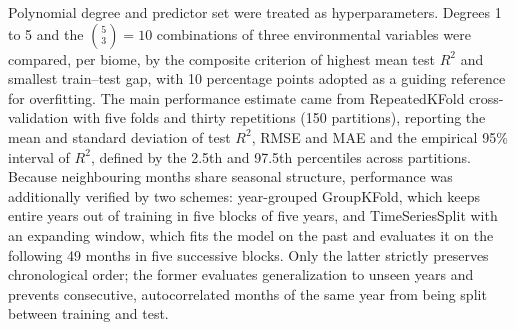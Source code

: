 \documentclass[a4paper,fleqn]{cas-dc}
\begin{document}
Polynomial degree and predictor set were treated as hyperparameters. Degrees 1 to 5 and the $\binom{5}{3} = 10$ combinations of three environmental variables were compared, per biome, by the composite criterion of highest mean test $R^2$ and smallest train--test gap, with 10 percentage points adopted as a guiding reference for overfitting. The main performance estimate came from RepeatedKFold cross-validation with five folds and thirty repetitions (150 partitions), reporting the mean and standard deviation of test $R^2$, RMSE and MAE and the empirical 95\% interval of $R^2$, defined by the 2.5th and 97.5th percentiles across partitions. Because neighbouring months share seasonal structure, performance was additionally verified by two schemes: year-grouped GroupKFold, which keeps entire years out of training in five blocks of five years, and TimeSeriesSplit with an expanding window, which fits the model on the past and evaluates it on the following 49 months in five successive blocks. Only the latter strictly preserves chronological order; the former evaluates generalization to unseen years and prevents consecutive, autocorrelated months of the same year from being split between training and test.
\end{document}
